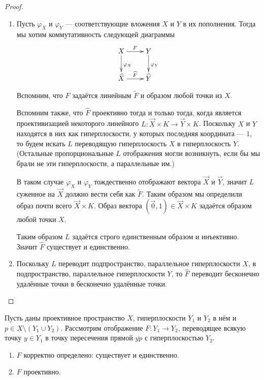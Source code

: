 \documentclass[12pt,a4paper]{article}
\begin{document}
    \begin{proof}
        \begin{enumerate}
            \item Пусть $\varphi_X$ и $\varphi_Y$ --- соответствующие вложения $X$ и $Y$ в их пополнения. Тогда мы хотим коммутативность следующей диаграммы
                \[
                    \xymatrix{
                        X \ar[d]^{\varphi_X} \ar[r]^F & Y \ar[d]^{\varphi_Y}\\
                        {\widehat{X}} \ar[r]^{\widehat{F}} & {\widehat{Y}}
                    }
                \]
        
                Вспомним, что $F$ задаётся линейным $\widetilde{F}$ и образом любой точки из $X$.
        
                Вспомним также, что $\widehat{F}$ проективно тогда и только тогда, когда является проективизацией некоторого линейного $L: \overrightarrow{X} \times K \to \overrightarrow{Y} \times K$. Поскольку $X$ и $Y$ находятся в них как гиперплоскости, у которых последняя координата --- $1$, то будем искать $L$ переводящую гиперплоскость $X$ в гиперплоскость $Y$. (Остальные пропорциональные $L$ отображения могли возникнуть, если бы мы брали не эти гиперплоскости, а параллельные им.)
                
                В таком случае $\varphi_X$ и $\varphi_Y$ тождественно отображают вектора $\overrightarrow{X}$ и $\overrightarrow{Y}$, значит $L$ суженное на $\overrightarrow{X}$ должно вести себя как $\widetilde{F}$. Таким образом мы определили образ почти всего $\overrightarrow{X} \times K$. Образ вектора $(\overrightarrow{0}, 1) \in \overrightarrow{X} \times K$ задаётся образом любой точки $X$.
        
                Таким образом $L$ задаётся строго единственным образом и инъективно. Значит $\widehat{F}$ существует и единственно.

            \item Поскольку $L$ переводит подпространство, параллельное гиперплоскости $X$, в подпространство, параллельное гиперплоскости $Y$, то $\widehat{F}$ переводит бесконечно удалённые точки в бесконечно удалённые точки.
        \end{enumerate}
    \end{proof}
    
    \begin{theorem}
        Пусть даны проективное пространство $X$, гиперплоскости $Y_1$ и $Y_2$ в нём и $p \in X \setminus (Y_1 \cup Y_2)$. Рассмотрим отображение $F: Y_1 \to Y_2$, переводящее всякую точку $y \in Y_1$ в точку пересечения прямой $\overline{yp}$ с гиперплоскостью $Y_2$.
        \begin{enumerate}
            \item $F$ корректно определено: существует и единственно.
            \item $F$ проективно.
        \end{enumerate}
    \end{theorem}
\end{document}
